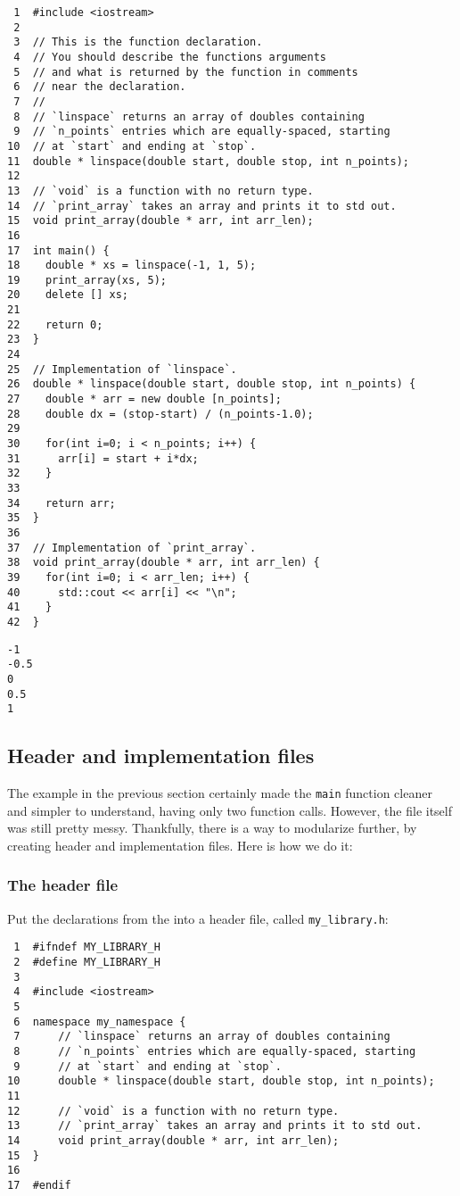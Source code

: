 \documentclass[11pt]{article}
\begin{document}
\begin{verbatim}
 1  #include <iostream>
 2  
 3  // This is the function declaration.
 4  // You should describe the functions arguments
 5  // and what is returned by the function in comments
 6  // near the declaration.
 7  //
 8  // `linspace` returns an array of doubles containing
 9  // `n_points` entries which are equally-spaced, starting
10  // at `start` and ending at `stop`.
11  double * linspace(double start, double stop, int n_points);
12  
13  // `void` is a function with no return type.
14  // `print_array` takes an array and prints it to std out.
15  void print_array(double * arr, int arr_len);
16  
17  int main() {
18    double * xs = linspace(-1, 1, 5);
19    print_array(xs, 5);
20    delete [] xs;
21  
22    return 0;
23  }
24  
25  // Implementation of `linspace`.
26  double * linspace(double start, double stop, int n_points) {
27    double * arr = new double [n_points];
28    double dx = (stop-start) / (n_points-1.0);
29  
30    for(int i=0; i < n_points; i++) {
31      arr[i] = start + i*dx;
32    }
33  
34    return arr;
35  }
36  
37  // Implementation of `print_array`.
38  void print_array(double * arr, int arr_len) {
39    for(int i=0; i < arr_len; i++) {
40      std::cout << arr[i] << "\n";
41    }
42  }
\end{verbatim}

\begin{verbatim}
-1
-0.5
0
0.5
1
\end{verbatim}

\subsection{Header and implementation files}
\label{sec:orgheadline45}

The example in the previous section certainly made the \texttt{main} function
cleaner and simpler to understand, having only two function calls. However, 
the file itself was still pretty messy. Thankfully, there is a way to modularize 
further, by creating header and implementation files. Here is how we do it:

\subsubsection{The header file}
\label{sec:orgheadline42}

Put the declarations from the into a header file, called \texttt{my\_library.h}:

\begin{verbatim}
 1  #ifndef MY_LIBRARY_H
 2  #define MY_LIBRARY_H
 3  
 4  #include <iostream>
 5  
 6  namespace my_namespace {
 7      // `linspace` returns an array of doubles containing
 8      // `n_points` entries which are equally-spaced, starting
 9      // at `start` and ending at `stop`.
10      double * linspace(double start, double stop, int n_points);
11  
12      // `void` is a function with no return type.
13      // `print_array` takes an array and prints it to std out.
14      void print_array(double * arr, int arr_len);
15  }
16  
17  #endif
\end{verbatim}
\end{document}
